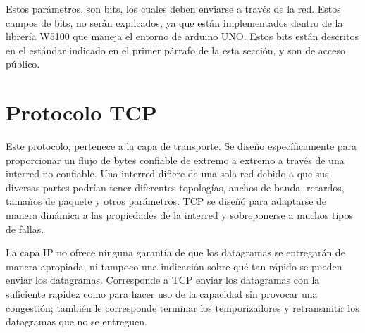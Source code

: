Estos parámetros, son bits, los cuales deben enviarse a través de la red. Estos campos de bits, no serán explicados, ya que están implementados dentro de la librería W5100 que maneja el entorno de arduino UNO. Estos bits están descritos en el estándar indicado en el primer párrafo de la esta sección, y son de acceso público. 


\section{Protocolo TCP } 
Este protocolo, pertenece a la capa de transporte. Se diseño específicamente para proporcionar un flujo de bytes confiable de extremo a extremo a través de una interred no confiable. Una interred difiere de una sola red debido a que sus diversas partes podrían tener diferentes topologías, anchos de banda, retardos, tamaños de paquete y otros parámetros. TCP se diseñó para adaptarse de manera dinámica a las propiedades de la interred y sobreponerse a muchos tipos de fallas.



La capa IP no ofrece ninguna garantía de que los datagramas se entregarán de manera apropiada, ni tampoco una indicación sobre qué tan rápido se pueden enviar los datagramas. Corresponde a TCP enviar los datagramas con la suficiente rapidez como para hacer uso de la capacidad sin provocar una congestión; también le corresponde terminar los temporizadores y retransmitir los datagramas que no se entreguen. 

